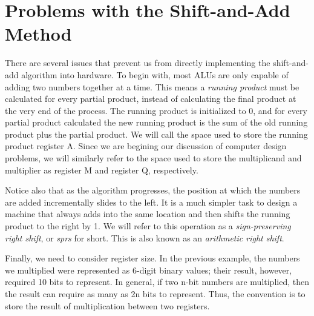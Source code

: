 \documentclass{article}
\begin{document}
\section{Problems with the Shift-and-Add Method}
There are several issues that prevent us from directly implementing the shift-and-add algorithm into hardware.
To begin with, most ALUs are only capable of adding two numbers together at a time.
This means a \emph{running product} must be calculated for every partial product, instead of calculating the final product at the very end of the process.
The running product is initialized to 0, and for every partial product calculated the new running product is the sum of the old running product plus the partial product.
We will call the space used to store the running product register A.
Since we are begining our discussion of computer design problems, we will similarly refer to the space used to store the multiplicand and multiplier as register M and register Q, respectively.

Notice also that as the algorithm progresses, the position at which the numbers are added incrementally slides to the left.
It is a much simpler task to design a machine that always adds into the same location and then shifts the running product to the right by 1.
We will refer to this operation as a \emph{sign-preserving right shift}, or \emph{sprs} for short.
This is also known as an \emph{arithmetic right shift}.

Finally, we need to consider register size.
In the previous example, the numbers we multiplied were represented as 6-digit binary values; their result, however, required 10 bits to represent.
In general, if two n-bit numbers are multiplied, then the result can require as many as 2n bits to represent.
Thus, the convention is to store the result of multiplication between two registers.

\pagebreak
\end{document}
